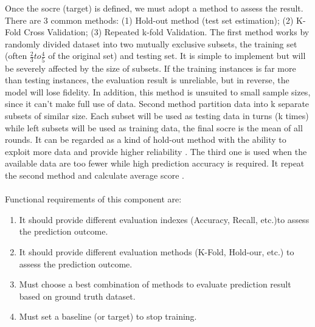 Once the socre (target) is defined, we must adopt a method to assess the result. There are 3 common methods: (1) Hold-out method (test set estimation); (2) K-Fold Cross Validation; (3) Repeated k-fold Validation. The first method works by randomly divided dataset into two mutually exclusive subsets, the training set (often $\frac{2}{3} to \frac{4}{5}$ of the original set) and testing set. It is simple to implement but will be severely affected by the size of subsets. If the training instances is far more than testing instances, the evaluation result is unreliable, but in reverse, the model will lose fidelity. In addition, this method is unsuited to small sample sizes, since it can't make full use of data\cite{omary2010machine,Chollet:2017:DLP:3203489}. Second method partition data into k separate subsets of similar size. Each subset will be used as testing data in turns (k times) while left subsets will be used as training data, the final socre is the mean of all rounds. It can be regarded as a kind of hold-out method with the ability to exploit more data and provide higher reliability \cite{omary2010machine}. The third one is used when the available data are too fewer while high prediction accuracy is required. It repeat the second method and calculate average score \cite{Chollet:2017:DLP:3203489}.  \\
\\
Functional requirements of this component are:
\begin{enumerate}
    \item It should provide different evaluation indexes (Accuracy, Recall, etc.)to assess the prediction outcome.
    \item It should provide different evaluation methods (K-Fold, Hold-our, etc.) to assess the prediction outcome.
    \item Must choose a best combination of methods to evaluate prediction result based on ground truth dataset.
    \item Must set a baseline (or target) to stop training.
\end{enumerate}

